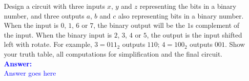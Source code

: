 \item{}
Design a circuit with three inputs $x$, $y$ and $z$ representing the bits in a
binary number, and three outputs $a$, $b$ and $c$ also representing bits in a
binary number. When the input is $0$, $1$, $6$ or $7$, the binary output will be
the $1$s complement of the input. When the binary input is $2$, $3$, $4$ or $5$,
the output is the input shifted left with rotate. For example, $3=011_2$
outputs $110$; $4=100_2$ outputs $001$. Show your truth table, all computations
for simplification and the final circuit.\\[12pt]
\ifanswers
\textcolor{blue}{
\textbf{Answer:}\\[12pt]
Answer goes here
}
\newpage
\fi

